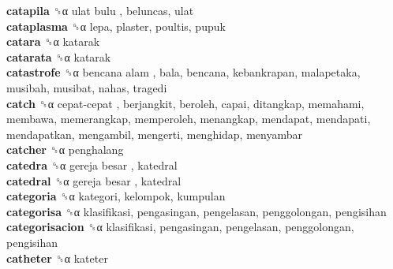 \textbf{catapila} ␝α   ulat bulu , beluncas, ulat  \\
\textbf{cataplasma} ␝α  lepa, plaster, poultis, pupuk  \\
\textbf{catara} ␝α  katarak  \\
\textbf{catarata} ␝α  katarak  \\
\textbf{catastrofe} ␝α   bencana alam , bala, bencana, kebankrapan, malapetaka, musibah, musibat, nahas, tragedi  \\
\textbf{catch} ␝α   cepat-cepat , berjangkit, beroleh, capai, ditangkap, memahami, membawa, memerangkap, memperoleh, menangkap, mendapat, mendapati, mendapatkan, mengambil, mengerti, menghidap, menyambar  \\
\textbf{catcher} ␝α  penghalang  \\
\textbf{catedra} ␝α   gereja besar , katedral  \\
\textbf{catedral} ␝α   gereja besar , katedral  \\
\textbf{categoria} ␝α  kategori, kelompok, kumpulan  \\
\textbf{categorisa} ␝α  klasifikasi, pengasingan, pengelasan, penggolongan, pengisihan  \\
\textbf{categorisacion} ␝α  klasifikasi, pengasingan, pengelasan, penggolongan, pengisihan  \\
\textbf{catheter} ␝α  kateter  \\
